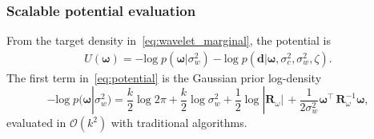\documentclass[12pt]{article}
\begin{document}
\subsubsection{Scalable potential evaluation}\label{sec:potential}
From the target density in~\eqref{eq:wavelet_marginal}, the potential is 
\begin{equation} \label{eq:potential}
\begin{aligned}
    U(\bm{\omega})
    = -\mbox{log} \; p(\bm{\omega}|\sigma_w^2) -\mbox{log} \; p(\bm{d} | \bm{\omega}, \sigma_c^2, \sigma_w^2, \zeta).  
\end{aligned}
\end{equation}
The first term in~\eqref{eq:potential} is the Gaussian prior log-density
\begin{equation} \label{eq:potential_w}
-\mbox{log} \; p(\bm{\omega}|\sigma_w^2) = 
    \frac{k}{2} \log 2\pi +\frac{k}{2} \log \sigma_w^2 +\frac{1}{2} \log|\bm{R}_{\omega}| \, +\frac{1}{2 \sigma_w^2}\bm{\omega}^{\top} \,\bm{R}_{\omega}^{-1} \bm{\omega},
\end{equation}
evaluated in $\mathcal{O}(k^2)$ with traditional algorithms.
\end{document}
